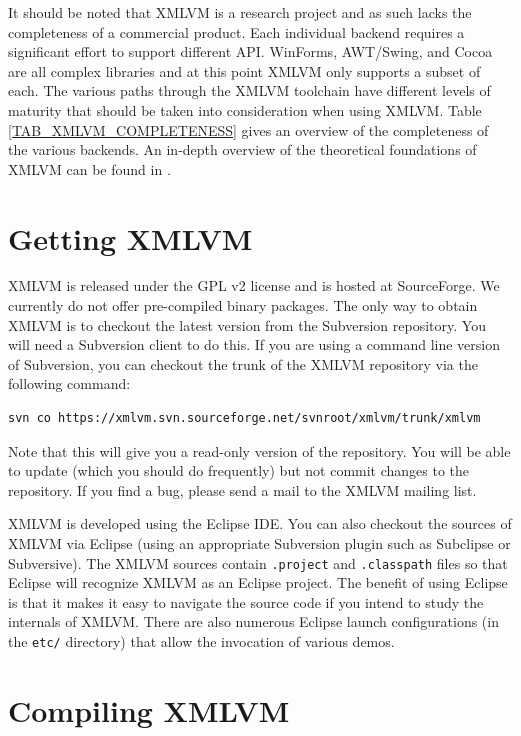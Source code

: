 \documentclass[11pt]{book}
\begin{document}
It should be noted that XMLVM is a research project and as such lacks
the completeness of a commercial product. Each individual backend
requires a significant effort to support different API. WinForms,
AWT/Swing, and Cocoa are all complex libraries and at this point XMLVM
only supports a subset of each. The various paths through the XMLVM
toolchain have different levels of maturity that should be taken
into consideration when using XMLVM. Table
\ref{TAB_XMLVM_COMPLETENESS} gives an overview of the completeness of
the various backends. An in-depth overview of the theoretical
foundations of XMLVM can be found in \cite{Puder:09a}.



\section{Getting XMLVM}
\label{SEC_GETTING_XMLVM}

XMLVM is released under the GPL v2 license and is hosted at
SourceForge. We currently do not offer pre-compiled binary packages.
The only way to obtain XMLVM is to checkout the latest version from
the Subversion repository. You will need a Subversion client to do
this. If you are using a command line version of Subversion, you can
checkout the trunk of the XMLVM repository via the following command:

\begin{verbatim}
svn co https://xmlvm.svn.sourceforge.net/svnroot/xmlvm/trunk/xmlvm
\end{verbatim}

Note that this will give you a read-only version of the repository.
You will be able to update (which you should do frequently) but not
commit changes to the repository. If you find a bug, please send a
mail to the XMLVM mailing list.

XMLVM is developed using the Eclipse IDE. You can also checkout the
sources of XMLVM via Eclipse (using an appropriate Subversion plugin
such as Subclipse or Subversive). The XMLVM sources contain
\texttt{.project} and \texttt{.classpath} files so that Eclipse will
recognize XMLVM as an Eclipse project. The benefit of using Eclipse is
that it makes it easy to navigate the source code if you intend to
study the internals of XMLVM. There are also numerous Eclipse launch
configurations (in the \texttt{etc/} directory) that allow the
invocation of various demos.


\section{Compiling XMLVM}
\label{SEC_COMPILING_XMLVM}
\end{document}
